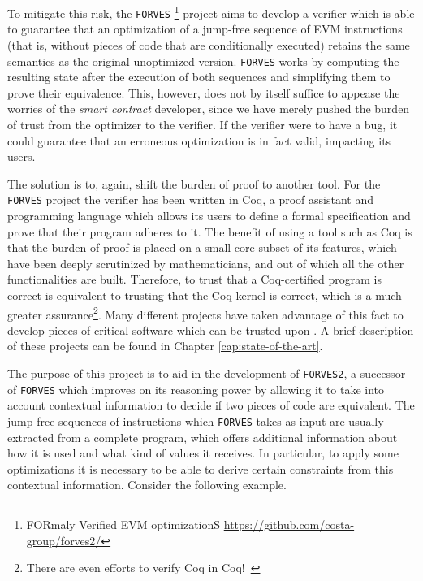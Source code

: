 To mitigate this risk, the \verb|FORVES|
\footnote{FORmaly Verified EVM optimizationS \url{https://github.com/costa-group/forves2/}}
project aims to develop a verifier which is able to guarantee that an optimization of a jump-free
sequence of EVM instructions (that is, without pieces of code that are conditionally executed)
retains the same semantics as the original unoptimized version. \verb|FORVES| works by computing the 
resulting state after the execution of both sequences and simplifying them to prove their
equivalence.
This, however, does not by itself suffice to appease the worries of the \emph{smart contract} 
developer, since we have merely pushed the burden of trust from the optimizer to the verifier. If the 
verifier were to have a bug, it could guarantee that an erroneous optimization is in fact valid,
impacting its users.

The solution is to, again, shift the burden of proof to another tool. For the \verb|FORVES| project the 
verifier has been written in Coq, a proof assistant and programming language which allows its users to 
define a formal specification and prove that their program adheres to it. The benefit of using a tool
such as Coq is that the burden of proof is placed on a small core subset of its features, which have
been deeply scrutinized by mathematicians, and out of which all the other functionalities are built.
Therefore, to trust that a Coq-certified program is correct is equivalent to trusting that the Coq  
kernel is correct, which is a much greater 
assurance\footnote{There are even efforts to verify Coq in Coq!\ \cite{sozeau:hal-04077552}}. 
Many different projects have taken advantage of this fact to develop pieces of critical software which
can be trusted upon \cite{ConCert,FiatCryptoSP19,CompCert,Iris,Cosette}. A brief description of these projects can be found in Chapter 
    \ref{cap:state-of-the-art}.

The purpose of this project is to aid in the development of \verb|FORVES2|, a successor of \verb|FORVES|
which improves on its reasoning power by allowing it to take into account contextual information to
decide if two pieces of code are equivalent. The jump-free sequences of instructions which \verb|FORVES|
takes as input are usually extracted from a complete program, which offers additional information about
how it is used and what kind of values it receives. In particular, to apply some optimizations it is
necessary to be able to derive certain constraints from this contextual information. Consider the 
following example.

